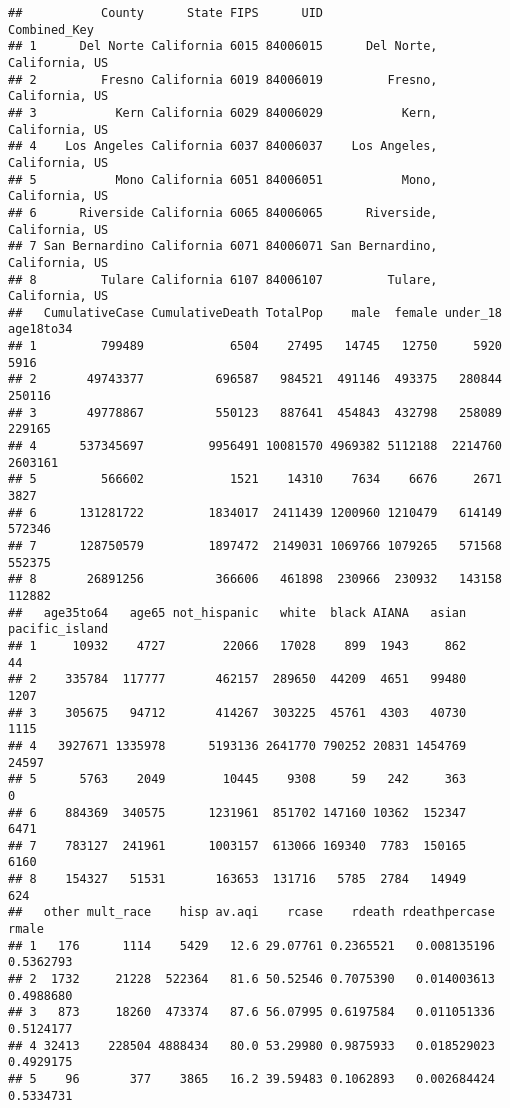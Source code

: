 \documentclass[
]{article}
\begin{document}
\begin{verbatim}
##           County      State FIPS      UID                   Combined_Key
## 1      Del Norte California 6015 84006015      Del Norte, California, US
## 2         Fresno California 6019 84006019         Fresno, California, US
## 3           Kern California 6029 84006029           Kern, California, US
## 4    Los Angeles California 6037 84006037    Los Angeles, California, US
## 5           Mono California 6051 84006051           Mono, California, US
## 6      Riverside California 6065 84006065      Riverside, California, US
## 7 San Bernardino California 6071 84006071 San Bernardino, California, US
## 8         Tulare California 6107 84006107         Tulare, California, US
##   CumulativeCase CumulativeDeath TotalPop    male  female under_18 age18to34
## 1         799489            6504    27495   14745   12750     5920      5916
## 2       49743377          696587   984521  491146  493375   280844    250116
## 3       49778867          550123   887641  454843  432798   258089    229165
## 4      537345697         9956491 10081570 4969382 5112188  2214760   2603161
## 5         566602            1521    14310    7634    6676     2671      3827
## 6      131281722         1834017  2411439 1200960 1210479   614149    572346
## 7      128750579         1897472  2149031 1069766 1079265   571568    552375
## 8       26891256          366606   461898  230966  230932   143158    112882
##   age35to64   age65 not_hispanic   white  black AIANA   asian pacific_island
## 1     10932    4727        22066   17028    899  1943     862             44
## 2    335784  117777       462157  289650  44209  4651   99480           1207
## 3    305675   94712       414267  303225  45761  4303   40730           1115
## 4   3927671 1335978      5193136 2641770 790252 20831 1454769          24597
## 5      5763    2049        10445    9308     59   242     363              0
## 6    884369  340575      1231961  851702 147160 10362  152347           6471
## 7    783127  241961      1003157  613066 169340  7783  150165           6160
## 8    154327   51531       163653  131716   5785  2784   14949            624
##   other mult_race    hisp av.aqi    rcase    rdeath rdeathpercase     rmale
## 1   176      1114    5429   12.6 29.07761 0.2365521   0.008135196 0.5362793
## 2  1732     21228  522364   81.6 50.52546 0.7075390   0.014003613 0.4988680
## 3   873     18260  473374   87.6 56.07995 0.6197584   0.011051336 0.5124177
## 4 32413    228504 4888434   80.0 53.29980 0.9875933   0.018529023 0.4929175
## 5    96       377    3865   16.2 39.59483 0.1062893   0.002684424 0.5334731

\end{verbatim}
\end{document}
